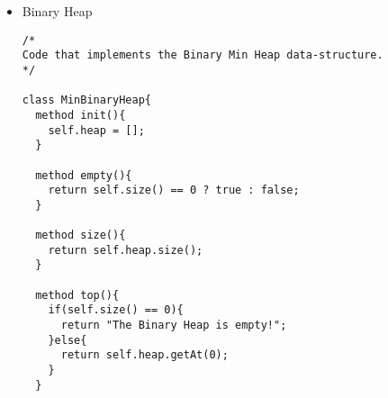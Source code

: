 \begin{itemize}
\begin{lstlisting}
      // Scenario where the node to be deleted has two children.
      // In this case, the inorder sucessor of the node to be deleted is retrieved:
      let temp = self.findMinimum(root.right);

      // Replacing the root's key and value with its inorder successor's key and value:
      root.key = temp.key;
      root.value = temp.value;

      // Deleting the inorder successor:
      root.right = self.aux_delete(root.right, temp.key);
    }

    return root;
  }

  method delete(key){
    self.root = self.aux_delete(self.root, key);
    self.length = self.length - 1;

    return;
  }

  method find(key){
    let curr = self.root;

    while(curr != nil and curr.key != key){
      if(key < curr.key){
        curr = curr.left;
      }else{
        curr = curr.right;
      }
    }

    return curr == nil ? "Could not find the key inside the BST" : curr;
  }

  method size(){
    return self.length;
  }

  method findMinimum(node){
    let curr = node;

    while(curr.left != nil){
      curr = curr.left;
    }

    return curr;
  }

  method inorderTraversal(curr){
    if(curr == nil){
      return;
    }
    self.inorderTraversal(curr.left);
    std::io::print(curr);
    self.inorderTraversal(curr.right);
  
    return;
  }
}
        \end{lstlisting}

    
    \item Binary Heap
        \begin{lstlisting}
/*
Code that implements the Binary Min Heap data-structure.
*/

class MinBinaryHeap{
  method init(){
    self.heap = [];
  }

  method empty(){
    return self.size() == 0 ? true : false;
  }

  method size(){
    return self.heap.size();
  }

  method top(){
    if(self.size() == 0){
      return "The Binary Heap is empty!";
    }else{
      return self.heap.getAt(0);
    }
  }


\end{lstlisting}
\end{itemize}
